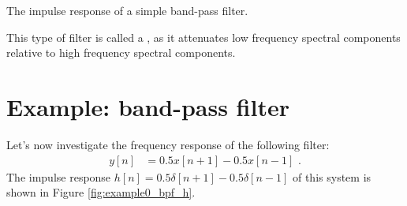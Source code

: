 \begin{marginfigure}
    \begin{center}
    \end{center}
    \caption{The impulse response of a simple band-pass filter.}
    \label{fig:example0_bpf_h}
\end{marginfigure}

This type of filter is called a \emph{}, as it attenuates low frequency spectral
components relative to high frequency spectral components.

\section{Example: band-pass filter}

Let's now investigate the frequency response of the following filter:
\begin{align}
    y[n] & = 0.5 x[n+1] - 0.5 x[n-1] \,\,.
\end{align}
The impulse response  $h[n]=0.5\delta[n+1]-0.5\delta[n-1]$ of this system is
shown in Figure \ref{fig:example0_bpf_h}.

